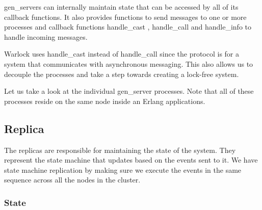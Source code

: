 gen\_servers can internally maintain state that can be accessed by all of its
callback functions. It also provides functions to send messages%
to one or more processes and callback functions handle\_cast%
, handle\_call%
 and handle\_info%
to handle incoming messages.

Warlock uses handle\_cast instead of handle\_call since the protocol is for
a system that communicates with asynchronous messaging. This also allows us
to decouple the processes and take a step towards creating a lock-free system.

Let us take a look at the individual gen\_server processes. Note that all of
these processes reside on the same node inside an Erlang applications.

\subsection{Replica}

The replicas are responsible for maintaining the state of the system. They
represent the state machine that updates based on the events sent to it. We
have state machine replication by making sure we execute the events in the same
sequence across all the nodes in the cluster.

\subsubsection{State}

